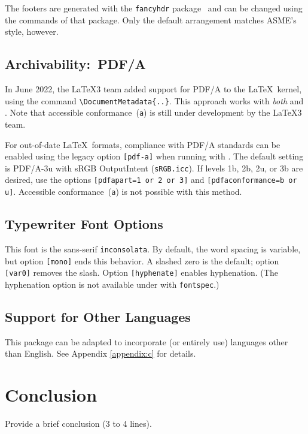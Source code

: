 \documentclass[captionpatch,colorlinks,upint,subscriptcorrection,varvw,mathalfa=cal=boondoxo,german]{asmeconf}
\begin{document}
The footers are generated with the \texttt{fancyhdr} package~\cite{oostrum} and can be changed using the commands of that package. Only the default arrangement matches ASME's style, however.

\subsection{Archivability:~PDF/A} In June 2022, the \LaTeX 3 team added support for PDF/A to the \LaTeX\ kernel, using the command \verb|\DocumentMetadata{..}|. This approach works with \textit{both}  and . Note that accessible  conformance~(\texttt{a}) is still under development by the  \LaTeX3 team.

For out-of-date \LaTeX\ formats, compliance with PDF/A standards can be enabled using the legacy option \texttt{[pdf-a]} when running with . The default setting is PDF/A-3u with sRGB OutputIntent (\texttt{sRGB.icc}). If levels 1b, 2b, 2u, or 3b are desired, use the
options \texttt{[pdfapart=1 or 2 or 3]} and  \texttt{[pdfaconformance=b or u]}. Accessible  conformance~(\texttt{a}) is not possible with this method. 

\subsection{Typewriter Font Options} This font is the sans-serif \texttt{inconsolata}. By default, the word spacing is variable, but option \texttt{[mono]} ends this behavior. A slashed zero is the default; option \texttt{[var0]} removes the slash. Option \texttt{[hyphenate]} enables hyphenation. (The hyphenation option is not available under  with \texttt{fontspec}.)

\subsection{Support for Other Languages}  This package can be adapted to incorporate (or entirely use) languages other than English. See Appendix \ref{appendix:c} for details.



\section{Conclusion}
Provide a brief conclusion (3 to 4 lines).


\end{document}

